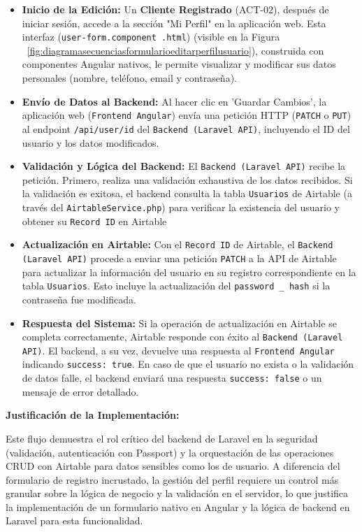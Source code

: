 \begin{itemize}
    \item \textbf{Inicio de la Edición:} Un \textbf{Cliente Registrado} (ACT-02), después de iniciar sesión, accede a la sección "Mi Perfil" en la aplicación web. Esta interfaz (\texttt{user-form.component .html}) (visible en la Figura ~\ref{fig:diagramasecuenciasformularioeditarperfilusuario}), construida con componentes Angular nativos, le permite visualizar y modificar sus datos personales (nombre, teléfono, email y contraseña).

    \item \textbf{Envío de Datos al Backend:} Al hacer clic en 'Guardar Cambios', la aplicación web (\texttt{Frontend Angular}) envía una petición HTTP (\texttt{PATCH} o \texttt{PUT}) al endpoint \texttt{/api/user/{id}} del \texttt{Backend (Laravel API)}, incluyendo el ID del usuario y los datos modificados.

    \item \textbf{Validación y Lógica del Backend:} El \texttt{Backend (Laravel API)} recibe la petición. Primero, realiza una validación exhaustiva de los datos recibidos. Si la validación es exitosa, el backend consulta la tabla \texttt{Usuarios} de Airtable (a través del \texttt{AirtableService.php}) para verificar la existencia del usuario y obtener su \texttt{Record ID} en Airtable

    \item \textbf{Actualización en Airtable:} Con el \texttt{Record ID} de Airtable, el \texttt{Backend (Laravel API)} procede a enviar una petición \texttt{PATCH} a la API de Airtable para actualizar la información del usuario en su registro correspondiente en la tabla \texttt{Usuarios}. Esto incluye la actualización del \texttt{password \_ hash} si la contraseña fue modificada.

    \item \textbf{Respuesta del Sistema:} Si la operación de actualización en Airtable se completa correctamente, Airtable responde con éxito al \texttt{Backend (Laravel API)}. El backend, a su vez, devuelve una respuesta al \texttt{Frontend Angular} indicando \texttt{success: true}. En caso de que el usuario no exista o la validación de datos falle, el backend enviará una respuesta \texttt{success: false} o un mensaje de error detallado.
\end{itemize}

\textbf{Justificación de la Implementación:}

Este flujo demuestra el rol crítico del backend de Laravel en la seguridad (validación, autenticación con Passport) y la orquestación de las operaciones CRUD con Airtable para datos sensibles como los de usuario. A diferencia del formulario de registro incrustado, la gestión del perfil requiere un control más granular sobre la lógica de negocio y la validación en el servidor, lo que justifica la implementación de un formulario nativo en Angular y la lógica de backend en Laravel para esta funcionalidad.

